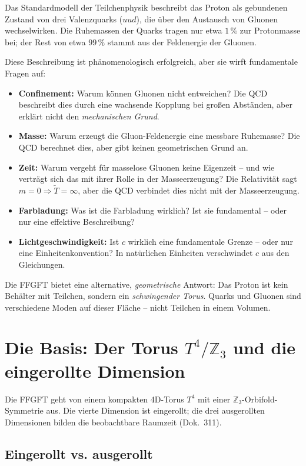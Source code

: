 \documentclass[11pt,a4paper]{article}
\begin{document}
	Das Standardmodell der Teilchenphysik beschreibt das Proton als gebundenen Zustand von drei Valenzquarks (\(uud\)), die über den Austausch von Gluonen wechselwirken. 
	Die Ruhemassen der Quarks tragen nur etwa \(1\,\%\) zur Protonmasse bei; 
	der Rest von etwa \(99\,\%\) stammt aus der Feldenergie der Gluonen.
	
	Diese Beschreibung ist phänomenologisch erfolgreich, aber sie wirft fundamentale Fragen auf:
	\begin{itemize}
		\item \textbf{Confinement:} Warum können Gluonen nicht entweichen? Die QCD beschreibt dies durch eine wachsende Kopplung bei großen Abständen, aber erklärt nicht den \emph{mechanischen Grund}.
		\item \textbf{Masse:} Warum erzeugt die Gluon-Feldenergie eine messbare Ruhemasse? Die QCD berechnet dies, aber gibt keinen geometrischen Grund an.
		\item \textbf{Zeit:} Warum vergeht für masselose Gluonen keine Eigenzeit -- und wie verträgt sich das mit ihrer Rolle in der Masseerzeugung? Die Relativität sagt \(m=0 \Rightarrow \tilde{T}=\infty\), aber die QCD verbindet dies nicht mit der Masseerzeugung.
		\item \textbf{Farbladung:} Was ist die Farbladung wirklich? Ist sie fundamental -- oder nur eine effektive Beschreibung?
		\item \textbf{Lichtgeschwindigkeit:} Ist \(c\) wirklich eine fundamentale Grenze -- oder nur eine Einheitenkonvention? In natürlichen Einheiten verschwindet \(c\) aus den Gleichungen.
	\end{itemize}
	
	Die FFGFT bietet eine alternative, \emph{geometrische} Antwort: Das Proton ist kein Behälter mit Teilchen, sondern ein \emph{schwingender Torus}. 
	Quarks und Gluonen sind verschiedene Moden auf dieser Fläche -- nicht Teilchen in einem Volumen.
	
	\section{Die Basis: Der Torus \(T^4/\mathbb{Z}_3\) und die eingerollte Dimension}
	
	Die FFGFT geht von einem kompakten 4D-Torus \(T^4\) mit einer \(\mathbb{Z}_3\)-Orbifold-Symmetrie aus. 
	Die vierte Dimension ist eingerollt; die drei ausgerollten Dimensionen bilden die beobachtbare Raumzeit (Dok.~311).
	
	\subsection{Eingerollt vs. ausgerollt}
	
\end{document}
